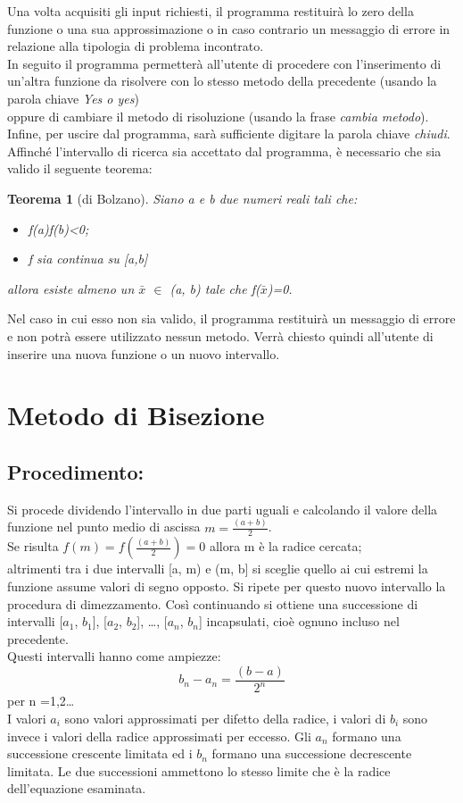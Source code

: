 \documentclass[a4paper,12pt,]{article}
\begin{document}
Una volta acquisiti gli input richiesti, il programma restituirà lo zero della funzione o una sua approssimazione o
in caso contrario un messaggio di errore in relazione alla tipologia di problema incontrato.\\
In seguito il programma  permetterà all'utente di procedere con l'inserimento di un'altra funzione da risolvere con lo stesso metodo della precedente (usando la parola chiave \emph {Yes o yes}) \\
oppure di cambiare il metodo di risoluzione (usando la frase  \emph {cambia metodo}).
Infine, per uscire dal programma, sarà sufficiente digitare la parola chiave \emph{chiudi}.
Affinché l'intervallo di ricerca sia accettato dal programma, è necessario che sia valido il seguente teorema:

\newtheorem{Teorema}{Teorema}
\begin{Teorema}[di Bolzano]
Siano a e b due numeri reali tali che:
\begin{itemize}
\item  f(a)f(b)<0;
\item  f sia continua su [a,b]
\end{itemize}	
allora esiste almeno un $\bar{x}$ $\in$  (a, b) tale che f($\bar{x}$)=0.
\end{Teorema}
Nel caso in cui esso non sia valido, il programma restituirà un messaggio di errore e non potrà essere utilizzato nessun metodo.
Verrà chiesto quindi all'utente di inserire una nuova funzione o un nuovo intervallo.

\section{Metodo di Bisezione}
\subsection{Procedimento:}
Si procede dividendo l'intervallo in due parti uguali e calcolando il valore della funzione nel punto medio di ascissa   $m = \frac{(a+b)}{2}$.
\\
Se risulta  $f(m) =f (\frac{(a+b)}{2}) = 0$   allora m è la radice cercata; 
\\
altrimenti tra i due intervalli [a, m) e (m, b] si sceglie quello ai cui estremi la funzione  assume  valori di segno opposto. 
Si ripete per questo  nuovo intervallo la procedura di dimezzamento.
Così continuando si ottiene una successione di intervalli [$a_1$, $b_1$], [$a_2$, $b_2$], \dots, [$a_n$, $b_n$] incapsulati,
cioè ognuno incluso nel precedente. 
\\
Questi intervalli hanno come ampiezze:
\begin{equation} b_n- a_n=\frac{(b-a)}{2^n}  \end {equation}per n =1,2\dots
\\
I valori $a_i$ sono valori approssimati per difetto della radice, i valori di $b_i$ sono invece i valori della radice approssimati per eccesso. 
Gli $a_n$ formano una successione crescente limitata ed i $b_n$ formano una successione decrescente limitata.
Le due successioni ammettono lo stesso limite che è la radice dell'equazione esaminata.
\end{document}
